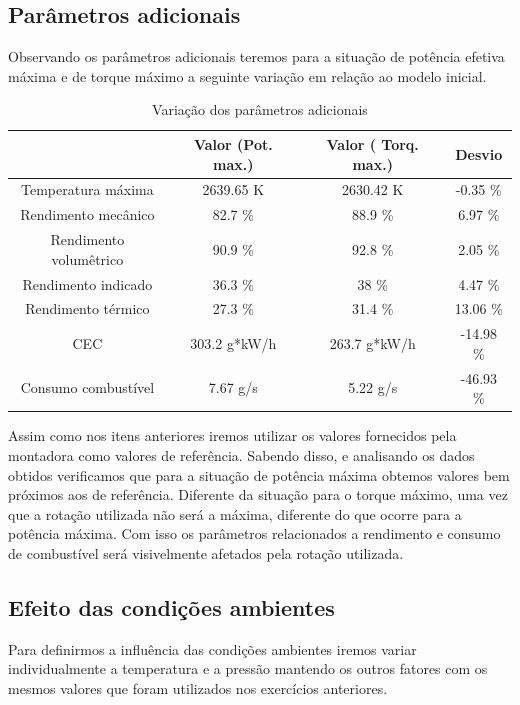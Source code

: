\documentclass[a4paper]{article}
\begin{document}
\subsection{Parâmetros adicionais}
Observando os parâmetros adicionais teremos para a situação de potência efetiva máxima e de torque máximo a seguinte variação em relação ao modelo inicial.
\begin{table}[!ht]
    \centering
    \begin{tabular}{|c|c|c|c|}
    \hline
    & Valor (Pot. max.) & Valor ( Torq. max.) & Desvio\\
    \hline
    Temperatura máxima & 2639.65 K &  2630.42 K & -0.35 \% \\
    \hline
    Rendimento mecânico & 82.7 \% & 88.9 \% & 6.97 \%\\
    \hline
    Rendimento volumêtrico & 90.9 \% & 92.8 \%  & 2.05 \%\\
    \hline
    Rendimento indicado & 36.3 \% & 38 \% & 4.47 \%\\
    \hline
    Rendimento térmico & 27.3 \% & 31.4 \% & 13.06 \%\\
    \hline
    CEC & 303.2 g*kW/h & 263.7 g*kW/h & -14.98 \%\\
    \hline
    Consumo combustível & 7.67 g/s & 5.22 g/s & -46.93 \%\\
    \hline
    \end{tabular}
    \caption{Variação dos parâmetros adicionais}
\end{table}
\vspace{1mm}

Assim como nos itens anteriores iremos utilizar os valores fornecidos pela montadora como valores de referência. Sabendo disso, e analisando os dados obtidos verificamos que para a situação de potência máxima obtemos valores bem próximos aos de referência. Diferente da situação para o torque máximo, uma vez que a rotação utilizada não será a máxima, diferente do que ocorre para a potência máxima. Com isso os parâmetros relacionados a rendimento e consumo de combustível será visivelmente afetados pela rotação utilizada.


\subsection{Efeito das condições ambientes}
Para definirmos a influência das condições ambientes iremos variar individualmente a temperatura e a pressão mantendo os outros fatores com os mesmos valores que foram utilizados nos exercícios anteriores.
\end{document}
